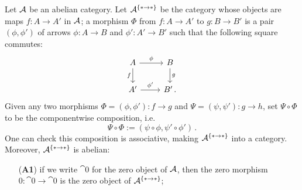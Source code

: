 \begin{ex}
    Let $\mathcal{A}$ be an abelian category.
    Let $\mathcal{A}^{\{\ast \to \ast\}}$ be the category whose
    objects are maps $f:A \to A'$ in $\mathcal{A}$;
    a morphism $\Phi$ from $f:A \to A'$ to $g:B \to B'$
    is a pair $(\phi,\phi')$ of arrows $\phi:A \to B$
    and $\phi':A' \to B'$ such that the following square commutes:
    \begin{equation*}
        \begin{tikzcd}
            A \ar[r, "\phi"] \ar[d,"f"'] & B \ar[d, "g"]\\
            A' \ar[r, "\phi'"] & B'\,.
        \end{tikzcd}
    \end{equation*}
    Given any two morphisms $\Phi = (\phi,\phi') : f \to g$
    and $\Psi = (\psi,\psi'):g \to h$, set $\Psi \circ \Phi$
    to be the componentwise composition, i.e.
    $$\Psi \circ \Phi := (\psi \circ \phi,\psi' \circ \phi')\,.$$
    One can check this composition is associative,
    making $\mathcal{A}^{\{\ast \to \ast\}}$ into a category.
    Moreover, $\mathcal{A}^{\{\ast \to \ast\}}$ is abelian:
    \begin{itemize}
        \item[(\textbf{A1})] if we write $\cat{0}$
        for the zero object of $\mathcal{A}$, then the zero morphism
        $0: \cat{0} \to \cat{0}$ is the zero object of 
        $\mathcal{A}^{\{\ast \to \ast\}}$;


\end{itemize}
\end{ex}
